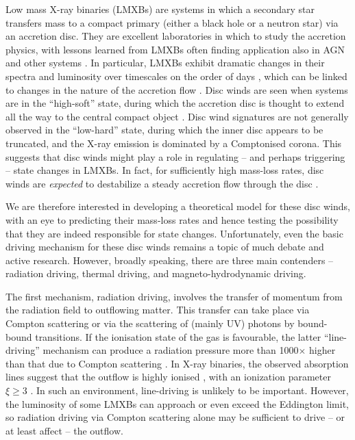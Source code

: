 \documentclass[a4paper,fleqn,usenatbib]{mnras}
\begin{document}
Low mass X-ray binaries (LMXBs) are systems in which a secondary star transfers mass to a 
compact primary (either a black hole or a neutron star)
via an accretion disc. They are excellent laboratories in which to
study the accretion physics, with lessons learned from LMXBs often finding application also in AGN and other systems \citep{2001MNRAS.323L..26U,2003MNRAS.345L..19M,2004A&A...414..895F,2006MNRAS.372.1366K,
2008Sci...320.1318K,
2012MNRAS.421.2854S,	
2013MNRAS.431.2535S,
2014MNRAS.438.1233S,
2015SciA....1E0686S,
2015MNRAS.448.2430V,
2018MNRAS.481.2140A}.
In particular, LMXBs exhibit dramatic changes in their spectra and luminosity over timescales on the order of days
\cite[e.g.][]{1999ApJ...520..776S,2004ApJ...610..378P}, which can be
linked to changes in the nature of the accretion flow
\cite[e.g.][]{1995PASP..107.1207N,2012Sci...337..540F}. Disc winds are 
seen when systems are in the ``high-soft'' state, during which the accretion disc is thought to extend all the way to the 
central compact object \cite[][although see \citealt{2016ApJ...830L...5H}]{2012MNRAS.422L..11P}. Disc wind signatures are not generally
observed in the ``low-hard'' state, during which the inner disc appears to be truncated, and the X-ray emission is dominated by a
Comptonised corona. This suggests that disc winds might play a role in
regulating -- and perhaps triggering -- state changes in LMXBs. In
fact, for sufficiently high mass-loss rates, disc winds are {\em
  expected} to destabilize a steady accretion flow through the 
disc \citep{1986ApJ...306...90S}.

We are therefore interested in developing a theoretical model for
these disc winds, with an eye to 
predicting their mass-loss rates and hence testing the possibility
that they are indeed responsible for state changes. Unfortunately, even the
basic driving mechanism for these disc winds remains a topic of much
debate and active research. However, broadly speaking, there are three main contenders --
radiation driving, thermal driving, and magneto-hydrodynamic driving. 

The first mechanism, radiation driving, involves the transfer of
momentum from the radiation field to outflowing matter. This transfer
can take place via Compton scattering or via the scattering of (mainly
UV) photons by bound-bound transitions. If the ionisation state of the gas is 
favourable, the latter ``line-driving'' mechanism can
produce a radiation pressure more than 1000$\times$ higher than that
due to Compton scattering \citep{1975ApJ...195..157C,
1995ApJ...454..410G}. In X-ray binaries, 
the observed absorption lines suggest that the outflow is highly ionised \citep[e.g.][]{2009ApJ...701..865K,
2018ApJ...861...26A}, with an ionization parameter $\xi \geq 3$
\citep{2016AN....337..368D}. In such an environment, line-driving is
unlikely to be important. However, the luminosity of some LMXBs can
approach or even exceed the Eddington limit, so radiation driving via
Compton scattering alone may be sufficient to drive -- or at least
affect -- the outflow.
\end{document}
